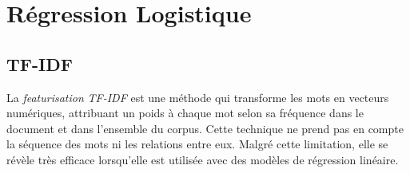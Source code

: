 \chapter{Régression Logistique}




\section{TF-IDF}
La \textit{featurisation} \textit{TF-IDF} est une méthode qui transforme les mots en vecteurs numériques, attribuant un poids à chaque mot selon sa fréquence dans le document et dans l'ensemble du corpus.
Cette technique ne prend pas en compte la séquence des mots ni les relations entre eux. Malgré cette limitation, elle se révèle très efficace lorsqu'elle est utilisée avec des modèles de régression linéaire.

